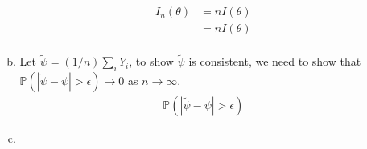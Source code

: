 \documentclass[a4paper,10pt]{article}
\theoremstyle{definition}
\begin{document}
\begin{enumerate}
\begin{enumerate}[(a)]
\begin{align*}
I_n(\theta) &= nI(\theta)\\
&= nI(\theta)\\
\end{align*}
\item Let $\tilde{\psi} = (1/n)\sum_iY_i$, to show $\tilde{\psi}$ is consistent, we need to show that $\mathbb{P}(|\tilde{\psi} - \psi|>\epsilon) \to 0$ as $n \to \infty$.
\begin{align*}
\mathbb{P}(|\tilde{\psi} - \psi|>\epsilon)
\end{align*}
\item
\end{enumerate}
\end{enumerate}
\end{document}
